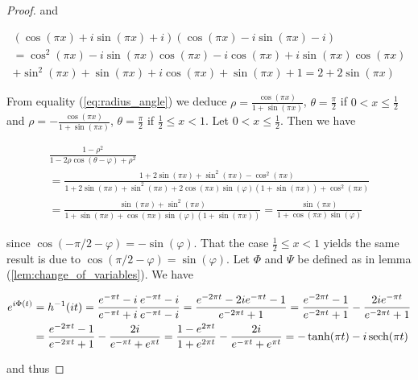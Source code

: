 \begin{proof}
and
	
\begin{multline*}
	\left( \cos(\pi x) + i\sin(\pi x) + i \right)\left( \cos(\pi x) - i\sin(\pi x) - i \right)\\ = \cos^2(\pi x) - i\sin(\pi x)\cos(\pi x) - i\cos(\pi x) + i\sin(\pi x)\cos(\pi x)\\
	+ \sin^2(\pi x) + \sin(\pi x)+ i \cos(\pi x) + \sin(\pi x) + 1 = 2 + 2\sin(\pi x)
\end{multline*}

	From equality (\ref{eq:radius_angle}) we deduce $\rho = \frac{\cos(\pi x)}{1 + \sin(\pi x)}$, $\theta = \frac{\pi}{2}$ if $0 < x \leqslant \frac{1}{2}$ and $\rho = -\frac{\cos(\pi x)}{1 + \sin(\pi x)}$, $\theta = \frac{\pi}{2}$ if $\frac{1}{2} \leqslant x < 1$. Let $0 < x \leqslant \frac{1}{2}$. Then we have

\begin{multline*}
	\frac{1 - \rho^2}{1 - 2\rho\cos(\theta - \varphi) + \rho^2} \\= \frac{1 + 2\sin(\pi x) + \sin^2(\pi x) - \cos^2(\pi x)}{1 + 2\sin(\pi x) + \sin^2(\pi x) + 2\cos(\pi x)\sin(\varphi)(1 + \sin(\pi x)) + \cos^2(\pi x)}\\
	= \frac{\sin(\pi x) + \sin^2(\pi x)}{1 + \sin(\pi x) + \cos(\pi x)\sin(\varphi)(1 + \sin(\pi x))}
	= \frac{\sin(\pi x)}{1 + \cos(\pi x)\sin(\varphi)}
\end{multline*}

	since $\cos\left( -\pi/2 - \varphi \right) = -\sin(\varphi)$. That the case $\frac{1}{2} \leqslant x < 1$ yields the same result is due to $\cos(\pi/2 - \varphi) = \sin(\varphi)$. Let $\Phi$ and $\Psi$ be defined as in lemma (\ref{lem:change_of_variables}). We have 
				
\begin{gather*}
	\begin{aligned}
		e^{i\Phi(t)} &= h^{-1}(it) = \frac{e^{-\pi t} - i}{e^{-\pi t} + i} \frac{e^{-\pi t} - i}{e^{-\pi t} - i} = \frac{e^{-2\pi t} - 2ie^{-\pi t} - 1}{e^{-2\pi t} + 1} = \frac{e^{-2\pi t} - 1}{e^{-2\pi t} + 1} - \frac{2ie^{-\pi t}}{e^{-2\pi t} + 1}\\ 
		&= \frac{e^{-2\pi t} - 1}{e^{-2\pi t} + 1} - \frac{2i}{e^{-\pi t} + e^{\pi t}} = \frac{1 - e^{2\pi t}}{1 + e^{2\pi t}} - \frac{2i}{e^{-\pi t} + e^{\pi t}} = -\tanh (\pi t) - i \operatorname{sech}(\pi t)
	\end{aligned}
\end{gather*}
	
and thus


\end{proof}
